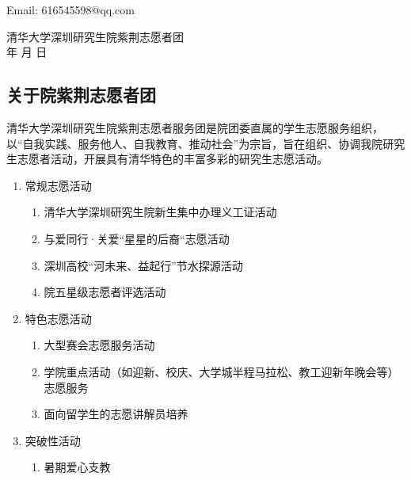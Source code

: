 \documentclass[12pt]{ctexart}
\begin{document}
Email: 616545598@qq.com
\begin{flushright}
清华大学深圳研究生院紫荆志愿者团\\
\the\year 年 \the\month 月 \the\day 日
\end{flushright}
\begin{appendix}
\section{关于院紫荆志愿者团}
清华大学深圳研究生院紫荆志愿者服务团是院团委直属的学生志愿服务组织，以“自我实践、服务他人、自我教育、推动社会”为宗旨，旨在组织、协调我院研究生志愿者活动，开展具有清华特色的丰富多彩的研究生志愿活动。
\begin{enumerate}[label = {\chinese*、}]
\item 常规志愿活动
\begin{enumerate}[label =(\arabic*)]
         \item  清华大学深圳研究生院新生集中办理义工证活动
         \item 与爱同行·关爱“星星的后裔“志愿活动
         \item  深圳高校“河未来、益起行”节水探源活动
         \item 院五星级志愿者评选活动
\end{enumerate}
\item 特色志愿活动
\begin{enumerate}[label =(\arabic*)]
        \item 大型赛会志愿服务活动
        \item 学院重点活动（如迎新、校庆、大学城半程马拉松、教工迎新年晚会等）志愿服务
        \item 面向留学生的志愿讲解员培养
\end{enumerate}
\item 突破性活动
\begin{enumerate}[label =(\arabic*)]
         \item 暑期爱心支教
\end{enumerate}
\end{enumerate}

\end{appendix}
\end{document}
